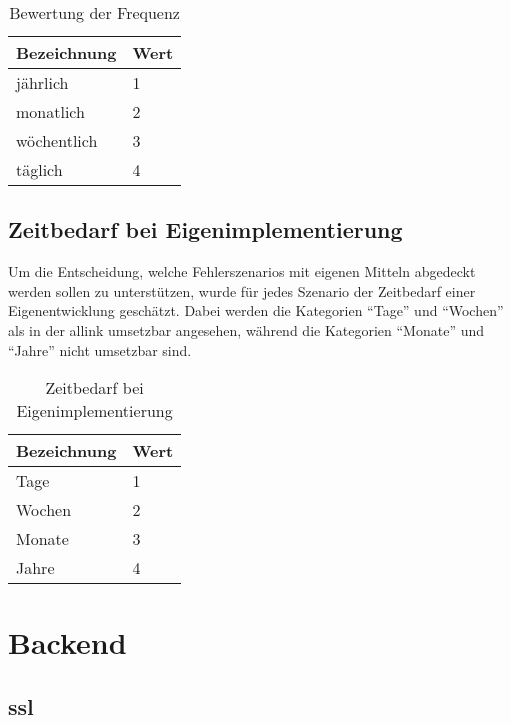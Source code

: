 \begin{table}[h!]
  \centering
  \begin{tabular}{ll}
  \toprule
    \textbf{Bezeichnung} & \textbf{Wert}\\
  \hline
    jährlich & 1\\
  \hline
    monatlich & 2\\
  \hline
    wöchentlich & 3\\
  \hline
    täglich & 4\\
  \bottomrule
  \end{tabular}
  \caption{Bewertung der Frequenz}
  \label{tab:fehler_frequenz}
\end{table}

\subsection{Zeitbedarf bei Eigenimplementierung}
\label{sub:zeitbedarf_bei_eigenimplementierung}
Um die Entscheidung, welche Fehlerszenarios mit eigenen Mitteln abgedeckt werden sollen zu unterstützen, wurde für jedes Szenario der Zeitbedarf einer Eigenentwicklung geschätzt. Dabei werden die Kategorien ``Tage'' und ``Wochen'' als in der allink umsetzbar angesehen, während die Kategorien ``Monate'' und ``Jahre'' nicht umsetzbar sind.

\begin{table}[h!]
  \centering
  \begin{tabular}{ll}
  \toprule
    \textbf{Bezeichnung} & \textbf{Wert}\\
  \hline
    Tage & 1\\
  \hline
    Wochen & 2\\
  \hline
    Monate & 3\\
  \hline
    Jahre & 4\\
  \bottomrule
  \end{tabular}
  \caption{Zeitbedarf bei Eigenimplementierung}
  \label{tab:zeitbedarf_bei_eigenimplementierung}
\end{table}

\section{Backend}
\label{sec:backend}

\subsection{\acrshort{ssl}}
\label{sub:fehler_ssl}

